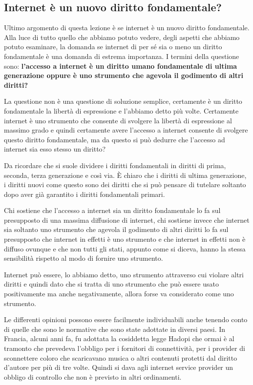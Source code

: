 \subsection{Internet è un nuovo diritto fondamentale?}
 Ultimo argomento di questa lezione è se internet è un nuovo diritto fondamentale. Alla luce di tutto quello che abbiamo potuto vedere, degli aspetti che abbiamo potuto esaminare, la domanda se internet di per sé sia o meno un diritto fondamentale è una domanda di estrema importanza. I termini della questione sono: \textbf{l'accesso a internet è un diritto umano fondamentale di ultima generazione oppure è uno strumento che agevola il godimento di altri diritti?}\par
 La questione non è una questione di soluzione semplice, certamente è un diritto fondamentale la libertà di espressione e l'abbiamo detto più volte. Certamente internet è uno strumento che consente di svolgere la libertà di espressione al massimo grado e quindi certamente avere l'accesso a internet consente di svolgere questo diritto fondamentale, ma da questo si può dedurre che l'accesso ad internet sia esso stesso un diritto? \par
 Da ricordare che si suole dividere i diritti fondamentali in diritti di prima, seconda, terza generazione e così via. È chiaro che i diritti di ultima generazione, i diritti nuovi come questo sono dei diritti che si può pensare di tutelare soltanto dopo aver già garantito i diritti fondamentali primari.\par
 Chi sostiene che l'accesso a internet sia un diritto fondamentale lo fa sul presupposto di una massima diffusione di internet, chi sostiene invece che internet sia soltanto uno strumento che agevola il godimento di altri diritti lo fa sul presupposto che internet in effetti è uno strumento e che internet in effetti non è diffuso ovunque e che non tutti gli stati, appunto come si diceva, hanno la stessa sensibilità rispetto al modo di fornire uno strumento. \par
 Internet può essere, lo abbiamo detto, uno strumento attraverso cui violare altri diritti e quindi dato che si tratta di uno strumento che può essere usato positivamente ma anche negativamente, allora forse va considerato come uno strumento.\par
 Le differenti opinioni possono essere facilmente individuabili anche tenendo conto di quelle che sono le normative che sono state adottate in diversi paesi. In Francia, alcuni anni fa, fu adottata la cosiddetta legge Hadopi che ormai è al tramonto che prevedeva l'obbligo per i fornitori di connettività, per i provider di sconnettere coloro che scaricavano musica o altri contenuti protetti dal diritto d'autore per più di tre volte. Quindi si dava agli internet service provider un obbligo di controllo che non è previsto in altri ordinamenti. \par
